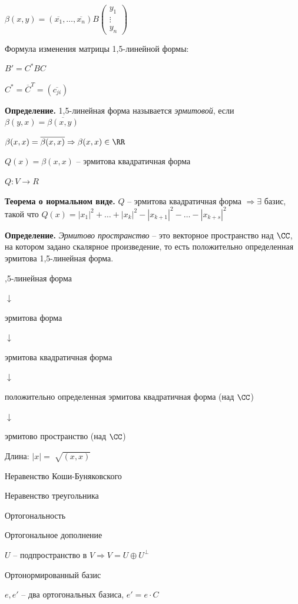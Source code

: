 $\beta(x, y) = (\overline{x_1}, \dots, \overline{x_n}) B \begin{pmatrix} y_1 \\ \vdots \\ y_{n} \end{pmatrix}$

\bigskip
Формула изменения матрицы 1,5-линейной формы:

$B' = C^* B C$

$C^* = \overline{C}^T = (\overline{c_{ji}})$

\bigskip
\textbf{Определение.} 1,5-линейная форма называется \textit{эрмитовой}, если $\beta(y, x) = \overline{\beta(x, y)}$

\bigskip
$\beta(x, x) = \overline{\beta(x, x)} \Rightarrow \beta(x, x) \in \RR$

$Q(x) = \beta(x, x)$ -- эрмитова квадратичная форма

\bigskip
$Q:V \rightarrow R$

\textbf{Теорема о нормальном виде.} $Q$ -- эрмитова квадратичная форма $\Rightarrow \exists$ базис, такой что $Q(x) = |x_1|^2 + \dots + |x_k|^2 - |x_{k+1}|^2 - \dots - |x_{k + s}|^2$

\bigskip
\textbf{Определение.} \textit{Эрмитово пространство} -- это векторное пространство над $\CC$, на котором задано скалярное произведение, то есть положительно определенная эрмитова 1,5-линейная форма.

,5-линейная форма

$\downarrow$

эрмитова форма

$\downarrow$

эрмитова квадратичная форма

$\downarrow$

положительно определенная эрмитова квадратичная форма (над $\CC$)

$\downarrow$

эрмитово пространство (над $\CC$)

\bigskip
Длина: $|x| = \sqrt[]{(x, x)}$

Неравенство Коши-Буняковского

Неравенство треугольника

Ортогональность

Ортогональное дополнение

$U$ -- подпространство в $V \Rightarrow V = U \oplus U^{\bot}$

Ортонормированный базис

\bigskip
$e, e'$ -- два ортогональных базиса, $e' = e \cdot C$

